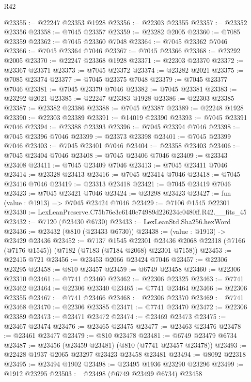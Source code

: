 \begin{lexlean}{R42}
\begin{coremodule}
{@23355 := @22247 @23353 @1928
@23356 := @22303 @23355
@23357 := @23352 @23356
@23358 := @7045 @23357
@23359 := @23282 @2005
@23360 := @7085 @23359
@23362 := @7045 @23360 @7048
@23364 := @7045 @23362 @7046
@23366 := @7045 @23364 @7046
@23367 := @7045 @23366
@23368 := @23292 @2005
@23370 := @22247 @23368 @1928
@23371 := @22303 @23370
@23372 := @23367 @23371
@23373 := @7045 @23372
@23374 := @23282 @2021
@23375 := @7085 @23374
@23377 := @7045 @23375 @7048
@23379 := @7045 @23377 @7046
@23381 := @7045 @23379 @7046
@23382 := @7045 @23381
@23383 := @23292 @2021
@23385 := @22247 @23383 @1928
@23386 := @22303 @23385
@23387 := @23382 @23386
@23388 := @7045 @23387
@23389 := @22248 @1928
@23390 := @22303 @23389
@23391 := @14019 @23390
@23393 := @7045 @23391 @7046
@23394 := @23388 @23393
@23396 := @7045 @23394 @7046
@23398 := @7045 @23396 @7046
@23399 := @23373 @23398
@23401 := @7045 @23399 @7046
@23403 := @7045 @23401 @7046
@23404 := @23358 @23403
@23406 := @7045 @23404 @7046
@23408 := @7045 @23406 @7046
@23409 := @23343 @23408
@23411 := @7045 @23409 @7046
@23413 := @7045 @23411 @7046
@23414 := @23328 @23413
@23416 := @7045 @23414 @7046
@23418 := @7045 @23416 @7046
@23419 := @23313 @23418
@23421 := @7045 @23419 @7046
@23423 := @7045 @23421 @7046
@23424 := @23298 @23423
@23427 := fun (value : @1913) => @7045 @23424 @7046
@23429 := @7106 @1545 @22301
@23430 := LexLeanPreserve.C75b76e3c6140e74989d226234e0480ff.R42.__fits_45
@23432 := @7120 (@23430 @6730)
@23433 := LexLeanStd.Sha256.hexWord
@23436 := @23432 (@810 (@23433 @6730))
@23438 := (value : @1913) -> @23429 @23436
@23452 := @7137
    @1545
    @22301
    @23436
    @2068
    @22318
    (@7166 (@7176 @1545))
    (@7182 (@7183 (@7184 @2068) @22301 @7158))
@23453 := @22415 @721
@23456 := @23453 @2066 @23424 @7046
@23457 := @22306 @23295
@23458 := @810 @23457
@23459 := @6749 @23458
@23460 := @22306 @23310
@23461 := @7741 @23460
@23462 := @22306 @23325
@23463 := @7741 @23462
@23464 := @22306 @23340
@23465 := @7741 @23464
@23466 := @22306 @23355
@23467 := @7741 @23466
@23468 := @22306 @23370
@23469 := @7741 @23468
@23470 := @22306 @23385
@23471 := @7741 @23470
@23472 := @22306 @23389
@23473 := @23471 @23472
@23474 := @23469 @23473
@23475 := @23467 @23474
@23476 := @23465 @23475
@23477 := @23463 @23476
@23478 := @23461 @23477
@23479 := @810 @23478
@23481 := @6749 @23479 @6734
@23487 := @23456 (@23459 @23481) (@810 (@7741 @23457 @23478))
@23493 := @22428 @1937 @2065 @23297 @23423 @23458 @23481
@23494 := @8092 @22318
@23495 := @23494 @1902
@23498 := @23495 @1936 @23290 @23296
@23499 := @1912 @23295
@23503 := @23498 (@6749 @23499 @6734) @23458
}
\end{coremodule}
\end{lexlean}
